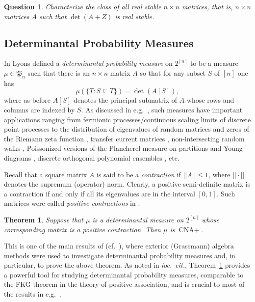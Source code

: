 \documentclass[10pt,reqno]{amsart}
\theoremstyle{plain}
\newtheorem{theorem}{Theorem}[section]
\newtheorem{question}[problem]{Question}
\theoremstyle{definition}
\theoremstyle{remark}
\newcommand{\CNA}{\text{CNA}}
\newcommand{\fP}{\mathfrak{P}}
\begin{document}
\begin{question}
Characterize the class of all real stable $n\times n$
matrices, that is,
$n\times n$ matrices $A$ such that $\det(A+Z)$ is real stable.
\end{question}

\subsection{Determinantal Probability Measures}\label{ss-det-m}

In \cite{Lyons} Lyons defined a {\em determinantal probability measure} 
on $2^{[n]}$ to 
be a measure $\mu\in\fP_n$ such that
there is an $n \times n$ matrix $A$ so that for any subset $S$ of 
$[n]$ one has 
\begin{equation}\label{det-me}
\mu(\{T: S \subseteq T\}) = \det(A[S]),
\end{equation}
where as before $A[S]$ denotes the principal submatrix of $A$ whose rows and 
columns are indexed by $S$. As discussed in e.g.~\cite{BKPV,Lyons}, such 
measures have important applications ranging from 
fermionic processes/continuous scaling limits of discrete point 
processes \cite{DVJ,Lyons-Steif} to the distribution of eigenvalues of 
random matrices and zeros of the Riemann zeta function \cite{Con}, 
transfer current matrices \cite{BP}, 
non-intersecting random walks \cite{Joh2}, 
Poissonized versions of the Plancherel
measure on partitions \cite{BOO}
and Young diagrams \cite{OR}, discrete orthogonal polynomial 
ensembles \cite{Joh}, etc.

Recall that a square matrix $A$ is said to be a {\em contraction} 
if $||A||\le 1$, where $||\cdot||$ denotes the supremum (operator) norm. 
Clearly, a positive semi-definite matrix is a contraction if and only
if all its eigenvalues are in the interval $[0,1]$. Such matrices were
called {\em positive contractions} in \cite{Lyons}. 

\begin{theorem}\label{contract}
Suppose that  $\mu$ is a determinantal measure on $2^{[n]}$ whose
corresponding matrix is a positive contraction. Then $\mu$ is $\CNA+$.
\end{theorem}

This is one of the main results of \cite{Lyons} 
(cf.~\cite[Theorem 8.1]{Lyons}), where 
exterior (Grassmann) algebra methods were used to investigate determinantal 
probability measures and, in particular, to prove the above theorem.
As noted in {\em loc.~cit.}, Theorem~\ref{contract} provides a powerful tool 
for studying determinantal probability measures, comparable to the FKG theorem
in the theory of positive association, and is crucial to most of the results
in e.g.~\cite{Lyons-Steif}. 
\end{document}
